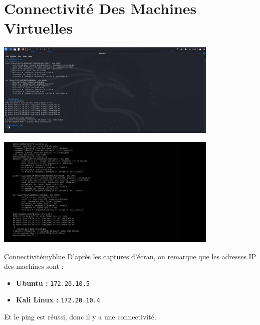 \section{Connectivité Des Machines Virtuelles}

\begin{center}
    \includegraphics[width=0.8\textwidth]{Question/SC/ping1.PNG}
\end{center}

\vspace{0.25cm}

\begin{center}
    \includegraphics[width=0.8\textwidth]{Question/SC/ping2.PNG}
\end{center}

\vspace{0.35cm}

\begin{prettyBox}{Connectivité}{myblue}
D'après les captures d'écran, on remarque que les adresses IP des machines sont :
\begin{itemize}
    \item \textbf{Ubuntu : } \texttt{172.20.10.5}
    \item \textbf{Kali Linux : } \texttt{172.20.10.4}
\end{itemize}
Et le ping est réussi, donc il y a une connectivité.
\end{prettyBox}


